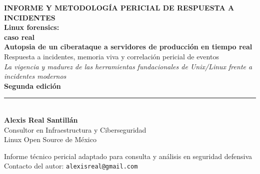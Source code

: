\begin{titlepage}

\newpage
\thispagestyle{empty}
\mbox{}
\newpage

\thispagestyle{empty}
\begin{center}
    \vspace*{1.2cm}

    {\fontsize{9}{12}\selectfont\sffamily\bfseries\color{secondary} INFORME Y METODOLOGÍA PERICIAL DE RESPUESTA A INCIDENTES}\\[0.8cm]

    {\fontsize{26}{30}\selectfont\sffamily\bfseries\color{primary} Linux forensics:}\\[0.3cm]
    {\fontsize{22}{26}\selectfont\sffamily\bfseries\color{primary} caso real}\\[0.8cm]

    {\large\textsf{\textbf{Autopsia de un ciberataque a servidores de producción en tiempo real}}}\\[0.4cm]
    {\normalsize\textsf{Respuesta a incidentes, memoria viva y correlación pericial de eventos}}\\[0.8cm]

    {\small\textsf{\textit{La vigencia y madurez de las herramientas fundacionales de Unix/Linux frente a incidentes modernos}}}\\[1.2cm]

    {\large\textsf{\textbf{Segunda edición}}}\\[1.4cm]

    \rule{0.35\textwidth}{1.0pt}\\[1.6cm]

    {\Large\textbf{Alexis Real Santillán}}\\[0.4cm]
    {\large Consultor en Infraestructura y Ciberseguridad}\\[0.2cm]
    {\normalsize\textsf{Linux Open Source de México}}\\[2.2cm]

    \vfill

    {\small\textsf{Informe técnico pericial adaptado para consulta y análisis en seguridad defensiva}}\\[0.2cm]
    {\footnotesize\textsf{Contacto del autor: \texttt{alexisreal@gmail.com}}}

\end{center}
\end{titlepage}

